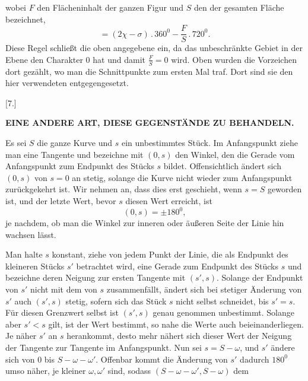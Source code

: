 %
\noindent wobei $F$ den Flächeninhalt der ganzen Figur und $S$ den der gesamten Fläche bezeichnet,
\[
= (2\chi - \sigma) \, . \, 360^0 - \frac{F}{S} \,.\,720^0.
\]
Diese Regel schließt die oben angegebene ein, da das unbeschränkte Gebiet in der Ebene den Charakter 0 hat und damit $\frac{F}{S} = 0$ wird. Oben wurden die Vorzeichen dort gezählt, wo man die Schnittpunkte zum ersten Mal traf. Dort sind sie den hier verwendeten entgegengesetzt.

\begin{center}
[7.]
\end{center}

\begin{center}\textbf{EINE ANDERE ART, DIESE GEGENSTÄNDE ZU BEHANDELN.}\end{center}

Es sei $S$ die ganze Kurve und $s$ ein unbestimmtes Stück. Im Anfangspunkt ziehe man eine Tangente und bezeichne mit $(0, s)$ den Winkel, den die Gerade vom Anfangspunkt zum Endpunkt des Stücks $s$ bildet. Offensichtlich ändert sich $(0, s)$ von $s = 0$ an stetig, solange die Kurve nicht wieder zum Anfangspunkt zurückgekehrt ist. Wir nehmen an, dass dies erst geschieht, wenn $s = S$ geworden ist, und der letzte Wert, bevor $s$ diesen Wert erreicht, ist
\[
(0, s) = \pm 180^0,
\]
je nachdem, ob man die Winkel zur inneren oder äußeren Seite der Linie hin wachsen lässt.

Man halte $s$ konstant, ziehe von jedem Punkt der Linie, die als Endpunkt des kleineren Stücks $s'$ betrachtet wird, eine Gerade zum Endpunkt des Stücks $s$ und bezeichne deren Neigung zur ersten Tangente mit $(s', s)$. Solange der Endpunkt von $s'$ nicht mit dem von $s$ zusammenfällt, ändert sich bei stetiger Änderung von $s'$ auch $(s', s)$ stetig, sofern sich das Stück $s$ nicht selbst schneidet, bis $s' = s$. Für diesen Grenzwert selbst ist $(s', s)$ genau genommen unbestimmt. Solange aber $s' < s$ gilt, ist der Wert bestimmt, so nahe die Werte auch beieinanderliegen. Je näher $s'$ an $s$ herankommt, desto mehr nähert sich dieser Wert der Neigung der Tangente zur Tangente im Anfangspunkt. Nun sei $s = S - \omega$, und $s'$ ändere sich von $0$ bis $S - \omega - \omega'$. Offenbar kommt die Änderung von $s'$ dadurch $180^0$ umso näher, je kleiner $\omega, \omega'$ sind, sodass $(S - \omega - \omega', S - \omega)$ dem
